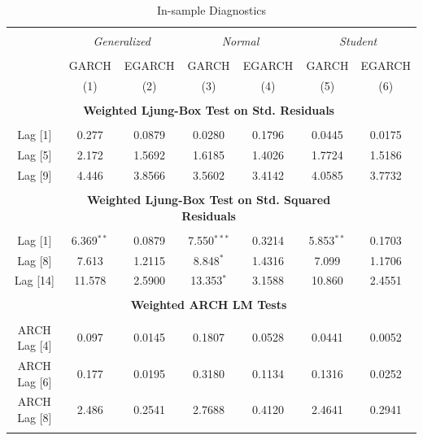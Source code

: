 \documentclass[a4paper]{article}
\begin{document}

\begin{table}[!htbp] \centering 
  \caption{In-sample Diagnostics} 
  \label{tab:diagnostic} %
\begin{tabular}{@{\extracolsep{5pt}}ccccccc} 
\\[-1.8ex]\hline 
\hline \\[-1.8ex] 
& \multicolumn{2}{c}{\textit{Generalized}} & \multicolumn{2}{c}{\textit{Normal}} & \multicolumn{2}{c}{\textit{Student}} \\ 
\cline{2-7}
\\[-1.8ex] & GARCH & EGARCH & GARCH & EGARCH & GARCH & EGARCH \\ 
& (1) & (2) & (3) & (4) & (5) & (6) \\ 
\hline \\[-1.8ex] 

& \multicolumn{5}{c}{\textbf{Weighted Ljung-Box Test on Std. Residuals}}\\
\hline \\[-1.8ex] 
Lag [1] & 0.277 & 0.0879 & 0.0280 & 0.1796 & 0.0445 & 0.0175 \\ 
Lag [5] & 2.172 & 1.5692 & 1.6185 & 1.4026 & 1.7724 & 1.5186 \\ 
Lag [9] & 4.446 & 3.8566 & 3.5602 & 3.4142 & 4.0585 & 3.7732 \\  
\hline \\[-1.8ex] 

& \multicolumn{5}{c}{\textbf{Weighted Ljung-Box Test on Std. Squared Residuals}}\\
\hline \\[-1.8ex] 
Lag [1] & 6.369$^{**}$ & 0.0879 & 7.550$^{***}$ & 0.3214 & 5.853$^{**}$ & 0.1703 \\ 
Lag [8] & 7.613 & 1.2115 & 8.848$^{*}$ & 1.4316 & 7.099 & 1.1706\\ 
Lag [14] & 11.578 & 2.5900 & 13.353$^{*}$ & 3.1588 & 10.860 & 2.4551\\
\hline \\[-1.8ex]

& \multicolumn{5}{c}{\textbf{Weighted ARCH LM Tests}}\\
\hline \\[-1.8ex] 
ARCH Lag [4] & 0.097 & 0.0145  & 0.1807 & 0.0528 & 0.0441 & 0.0052 \\ 
ARCH Lag [6] & 0.177 & 0.0195 & 0.3180 & 0.1134 & 0.1316 & 0.0252\\ 
ARCH Lag [8] & 2.486 & 0.2541 & 2.7688 & 0.4120 & 2.4641 & 0.2941\\
\hline \\[-1.8ex] 


\end{tabular}
\end{table}
\end{document}

